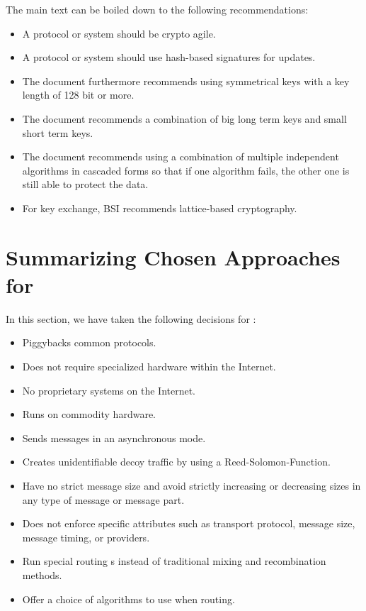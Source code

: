 \begin{itemize}
	The main text can be boiled down to the following recommendations:
	\begin{itemize}
		\item A protocol or system should be crypto agile.
		\item A protocol or system should use hash-based signatures for updates.
		\item The document furthermore recommends using symmetrical keys with a key length of 128 bit or more.
		\item The document recommends a combination of big long term keys and small short term keys.
		\item The document recommends using a combination of multiple independent algorithms in cascaded forms so that if one algorithm fails, the other one is still able to protect the data.
		\item For key exchange, BSI recommends lattice-based cryptography.
	\end{itemize} 
\end{itemize}

\section{Summarizing Chosen Approaches for \MessageVortex\label{sec:reqSummary}}
In this section, we have taken the following decisions for \MessageVortex:
\begin{itemize}
	\item Piggybacks common protocols.
	\item Does not require specialized hardware within the Internet.
	\item No proprietary systems on the Internet.
	\item Runs on commodity hardware.
	\item Sends messages in an asynchronous mode.
	\item Creates unidentifiable decoy traffic by using a Reed-Solomon-Function.
	\item Have no strict message size and avoid strictly increasing or decreasing sizes in any type of message or message part.
	\item Does not enforce specific attributes such as transport protocol, message size, message timing, or providers.
	\item Run special routing s instead of traditional mixing and recombination methods.
	\item Offer a choice of algorithms to use when routing.
\end{itemize}


